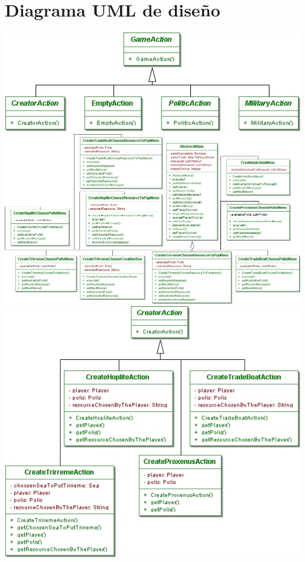 \documentclass[11 pt]{book}
\begin{document}
	\section{Diagrama UML de diseño}
		\begin{center}
		    \includegraphics[width=500px]{design-uml/iteration7/actions.jpg}
		    \includegraphics[width=500px]{design-uml/iteration7/creationmenus.jpg}
		    \includegraphics[width=500px]{design-uml/iteration7/creatoractions.jpg}

\end{center}
\end{document}
